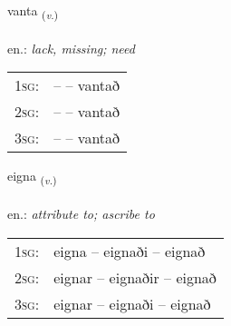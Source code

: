 \documentclass[frontgrid, backgrid]{flacards}\usepackage[]{graphicx}\usepackage[]{xcolor}
\begin{document}
\renewcommand{\flhead}{\vskip5pt \fboxsep=0pt {\small\bfseries\footnotesize Sagnorð | Verb}}
\renewcommand{\fcfoot}{\vskip5pt \fboxsep=0pt \hspace{2pt}{\small\bfseries\footnotesize 1K}}

\renewcommand{\blhead}{\vskip5pt {\small\bfseries\footnotesize Sagnorð | Verb }}
\renewcommand{\bcfoot}{\vskip5pt \hspace{2pt}{\small\bfseries\footnotesize 1K}}


{vanta \small{\textsubscript{(\textit{v.})}} \\[1ex] %
\textphonetic{[van̥ta]} \\
en.: \emph{lack, missing; need} \\  [2ex]
\renewcommand*{\arraystretch}{0.8}
\begin{tabular}{p{1cm}l}
\textsc{1sg}: &  --  -- vantað \\ 
\textsc{2sg}: &  --  -- vantað \\ 
\textsc{3sg}: &  --  -- vantað \\ 
\end{tabular}
}

\renewcommand{\flhead}{\vskip5pt \fboxsep=0pt {\small\bfseries\footnotesize Sagnorð | Verb}}
\renewcommand{\fcfoot}{\vskip5pt \fboxsep=0pt \hspace{2pt}{\small\bfseries\footnotesize 1K}}

\renewcommand{\blhead}{\vskip5pt {\small\bfseries\footnotesize Sagnorð | Verb }}
\renewcommand{\bcfoot}{\vskip5pt \hspace{2pt}{\small\bfseries\footnotesize 1K}}


{eigna \small{\textsubscript{(\textit{v.})}} \\[1ex] %
\textphonetic{[eikna]} \\
en.: \emph{attribute to; ascribe to} \\  [2ex]
\renewcommand*{\arraystretch}{0.8}
\begin{tabular}{p{1cm}l}
\textsc{1sg}: & eigna -- eignaði -- eignað \\ 
\textsc{2sg}: & eignar -- eignaðir -- eignað \\ 
\textsc{3sg}: & eignar -- eignaði -- eignað \\ 
\end{tabular}
}
\end{document}

